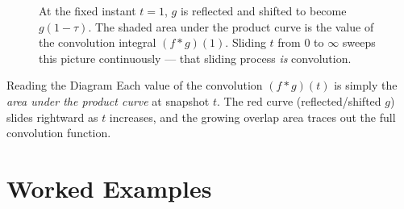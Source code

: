 \documentclass[12pt,a4paper]{article}
\begin{document}
\begin{figure}[h]
\centering
{}
\caption{At the fixed instant $t=1$, $g$ is reflected and shifted to become
$g(1-\tau)$. The shaded area under the product curve is the value of the
convolution integral $(f*g)(1)$. Sliding $t$ from $0$ to $\infty$ sweeps
this picture continuously --- that sliding process \emph{is} convolution.}
\end{figure}

\begin{learnbox}{Reading the Diagram}
Each value of the convolution $(f*g)(t)$ is simply the \emph{area under the product curve}
at snapshot $t$. The red curve (reflected/shifted $g$) slides rightward as $t$ increases,
and the growing overlap area traces out the full convolution function.
\end{learnbox}

\section{Worked Examples}
\end{document}
